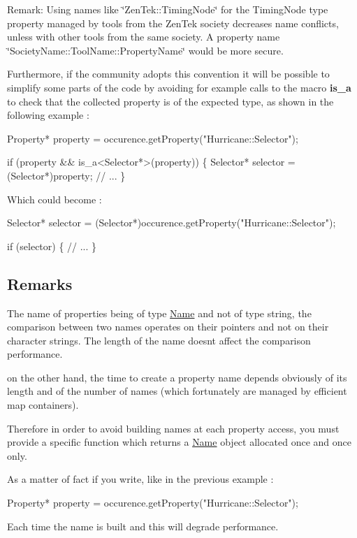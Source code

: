 \begin{DoxyParagraph}{Remark\+: Using names like \char`\"{}\+Zen\+Tek\+::\+Timing\+Node\char`\"{} for the Timing\+Node type }
property managed by tools from the Zen\+Tek society decreases name conflicts, unless with other tools from the same society. A property name \char`\"{}\+Society\+Name\+::\+Tool\+Name\+::\+Property\+Name\char`\"{} would be more secure.
\end{DoxyParagraph}
Furthermore, if the community adopts this convention it will be possible to simplify some parts of the code by avoiding for example calls to the macro {\bfseries is\+\_\+a} to check that the collected property is of the expected type, as shown in the following example \+: 
\begin{DoxyCode}
Property* \textcolor{keyword}{property} = occurence.getProperty(\textcolor{stringliteral}{"Hurricane::Selector"});
 
\textcolor{keywordflow}{if} (property && is\_a<Selector*>(property)) \{
  Selector* selector = (Selector*)property;
  \textcolor{comment}{// ...}
\}
\end{DoxyCode}
 Which could become \+: 
\begin{DoxyCode}
Selector* selector = (Selector*)occurence.getProperty(\textcolor{stringliteral}{"Hurricane::Selector"});
 
\textcolor{keywordflow}{if} (selector) \{
  \textcolor{comment}{// ...}
\}
\end{DoxyCode}
\hypertarget{classHurricane_1_1Property_secPropertyRemarks}{}\subsection{Remarks}\label{classHurricane_1_1Property_secPropertyRemarks}
The name of properties being of type \mbox{\hyperlink{classHurricane_1_1Name}{Name}} and not of type string, the comparison between two names operates on their pointers and not on their character strings. The length of the name doesn\textquotesingle{}t affect the comparison performance.

on the other hand, the time to create a property name depends obviously of its length and of the number of names (which fortunately are managed by efficient map containers).

Therefore in order to avoid building names at each property access, you must provide a specific function which returns a \mbox{\hyperlink{classHurricane_1_1Name}{Name}} object allocated once and once only.

As a matter of fact if you write, like in the previous example \+: 
\begin{DoxyCode}
Property* \textcolor{keyword}{property} = occurence.getProperty(\textcolor{stringliteral}{"Hurricane::Selector"});
\end{DoxyCode}
 Each time the name is built and this will degrade performance.

